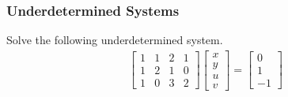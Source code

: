 \subsubsection{Underdetermined Systems}
\begin{exmp}
\label{exmp:underdetsys}
Solve the following underdetermined system.
\begin{align*}
\begin{bmatrix}
1 & 1 & 2 & 1 \\
1 & 2 & 1 & 0 \\
1 & 0 & 3 & 2 
\end{bmatrix}
\begin{bmatrix}
x \\
y \\
u \\
v
\end{bmatrix}
=
\begin{bmatrix}
0 \\
1 \\
-1
\end{bmatrix}
\end{align*}
\end{exmp}
